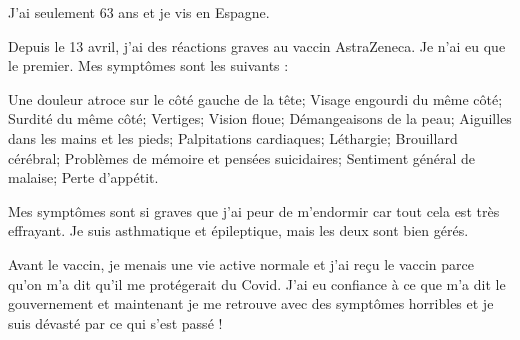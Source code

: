 J'ai seulement 63 ans et je vis en Espagne.

Depuis le 13 avril, j'ai des réactions graves au vaccin AstraZeneca. Je n'ai eu
que le premier. Mes symptômes sont les suivants :

Une douleur atroce sur le côté gauche de la tête; Visage engourdi du même côté;
Surdité du même côté; Vertiges; Vision floue; Démangeaisons de la peau;
Aiguilles dans les mains et les pieds; Palpitations cardiaques; Léthargie;
Brouillard cérébral; Problèmes de mémoire et pensées suicidaires; Sentiment
général de malaise; Perte d'appétit.

Mes symptômes sont si graves que j'ai peur de m'endormir car tout cela est très
effrayant. Je suis asthmatique et épileptique, mais les deux sont bien gérés.

Avant le vaccin, je menais une vie active normale et j'ai reçu le vaccin parce
qu'on m'a dit qu'il me protégerait du Covid. J'ai eu confiance à ce que m'a dit
le gouvernement et maintenant je me retrouve avec des symptômes horribles et je
suis dévasté par ce qui s'est passé !

